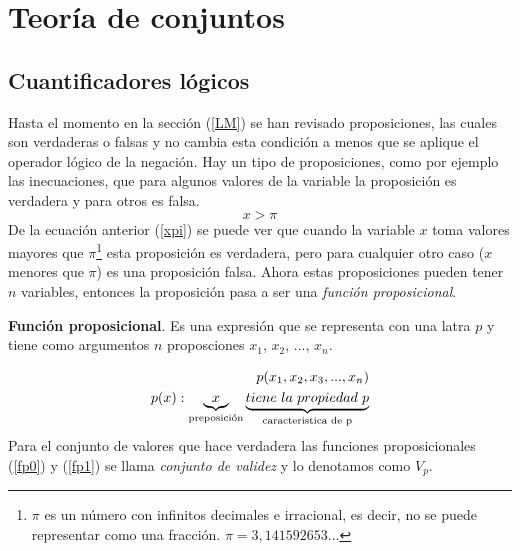 \chapter{Teoría de conjuntos}
\label{TC}


\section{Cuantificadores lógicos}
\label{TC0}

Hasta el momento en la sección (\ref{LM}) se han revisado proposiciones, las cuales son verdaderas o falsas y no cambia esta condición a menos que se aplique el operador lógico de la negación. Hay un tipo de proposiciones, como por ejemplo las inecuaciones, que para algunos valores de la variable la proposición es verdadera y para otros es falsa.
\begin{equation}
x > \pi
\label{xpi}
\end{equation}
De la ecuación anterior (\ref{xpi}) se puede ver que cuando la variable $x$ toma valores mayores que $\pi$\footnote{$\pi$ es un número con infinitos decimales e irracional, es decir, no se puede representar como una fracción. $\pi=3,141592653...$} esta proposición es verdadera, pero para cualquier otro caso ($x$ menores que $\pi$) es una proposición falsa. Ahora estas proposiciones pueden tener $n$ variables, entonces la proposición pasa a ser una \textit{función proposicional}.

\begin{mydef}
\textbf{Función proposicional}. Es una expresión que se representa con una latra $p$ y tiene como argumentos $n$ proposciones $x_{1}$, $x_{2}$, $...$, $x_{n}$.

\end{mydef}
\begin{eqnarray}
p(x_{1},x_{2},x_{3},...,x_{n})\label{fp0}\\
p(x): \underbrace{x}_\text{preposición} \underbrace{tiene\hspace{3px} la\hspace{3px} propiedad\hspace{3px} p}_\text{caracteristica de p}
\label{fp1}
\end{eqnarray}
Para el conjunto de valores que hace verdadera las funciones proposicionales (\ref{fp0}) y (\ref{fp1}) se llama \textit{conjunto de validez} y lo denotamos como $V_{p}$.

